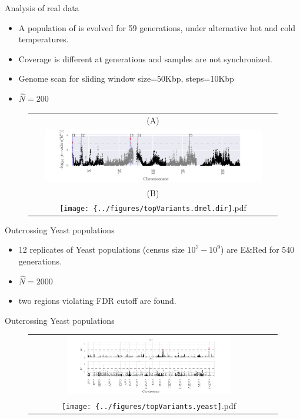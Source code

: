 \documentclass[t]{beamer} %
\begin{document}
\begin{frame}{ Analysis of real data}
\begin{itemize}
	\item A population of \dmel is evolved for 59 generations, under 
	alternative hot and cold temperatures.
	\item Coverage is different at generations and samples are not synchronized.
	\item Genome scan for sliding window size=50Kbp,  steps=10Kbp
	\item $\hat{N}=200$
\end{itemize}\end{frame}
\begin{frame}{\dmel}
\begin{figure}[H]
	\centering
	\begin{tabular}{c}
		(A)\\
		\includegraphics[trim=0.4in 0.in 0.6in 
		0in,clip,width=0.9\textwidth]{../figures/man-dmel-region.pdf}\\		
		(B)\\	
		\texttt{[image: \{../figures/topVariants.dmel.dir]}.pdf}
	\end{tabular}
\end{figure}
\end{frame}


\begin{frame}{Outcrossing Yeast populations}
\begin{itemize}
	\item 12 replicates of Yeast populations (census size $10^7-10^9$) are 
	E\&Red for 540 generations.
	\item $\hat{N}=2000$
	\item two regions violating FDR cutoff are found.
	
\end{itemize}
\end{frame}

\begin{frame}{Outcrossing Yeast populations}
		\begin{figure}[H]
			\centering
			\begin{tabular}{cc}
				\includegraphics[trim=0.4in 0.in 0.6in 
				0.0in,clip,width=0.7\textwidth]{../figures/man-yeast-snp.pdf}\\
					\texttt{[image: \{../figures/topVariants.yeast]}.pdf}
			\end{tabular}
		\end{figure}
\end{frame}
\end{document}
